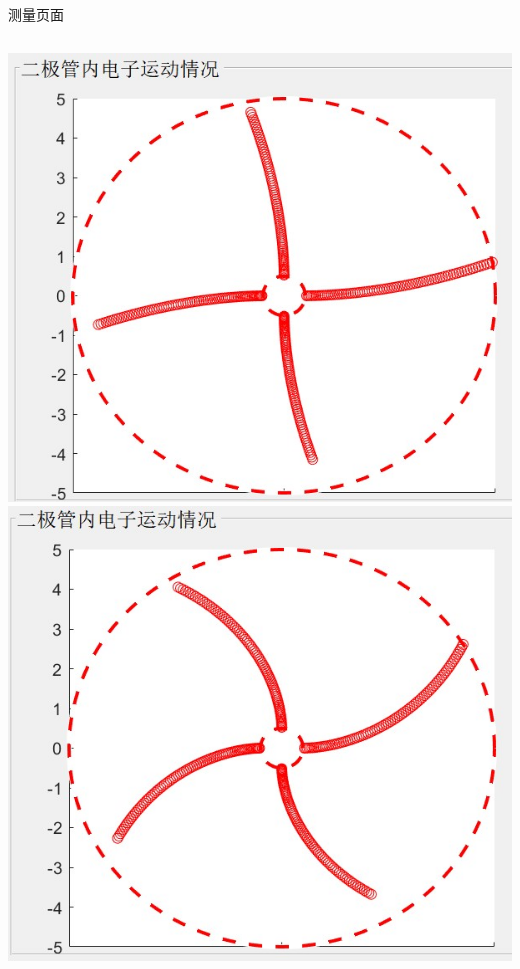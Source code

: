 \documentclass{beamer}
\begin{document}
    \begin{frame}{测量页面}{\thesection \, \secname}
        \begin{columns}
            \begin{column}{0.3\textwidth}
                \includegraphics[scale=0.35]{gallery/move5.jpg}
                \includegraphics[scale=0.35]{gallery/move6.jpg}
            \end{column}

\end{columns}
\end{frame}
\end{document}
